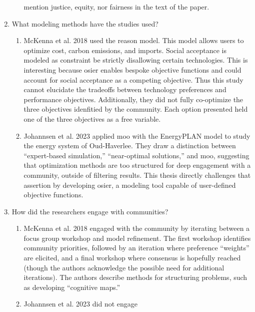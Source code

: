 \begin{enumerate}
\begin{enumerate}
        mention justice, equity, nor fairness in the text of the paper.
    \end{enumerate}
    \item What modeling methods have the studies used?
    \begin{enumerate}
        \item McKenna et al. 2018 \cite{mckenna_combining_2018} used the
        \ac{reason} model. This model allows users to optimize cost, carbon
        emissions, and imports. Social acceptance is modeled as constraint be
        strictly disallowing certain technologies. This is interesting because
        \ac{osier} enables bespoke objective functions and could account for
        social acceptance as a competing objective. Thus this study cannot
        elucidate the tradeoffs between technology preferences and performance
        objectives. Additionally, they did not fully co-optimize the three
        objectives idenfitied by the community. Each option presented held one
        of the three objectives as a free variable.
        \item Johannsen et al. 2023 \cite{johannsen_municipal_2023} applied
        \ac{moo} with the EnergyPLAN model to study the energy system of
        Oud-Haverlee. They draw a distinction between ``expert-based
        simulation,'' ``near-optimal solutions,'' and \ac{moo}, suggesting that
        optimization methods are too structured for deep engagement with a
        community, outside of filtering results. This thesis directly challenges
        that assertion by developing \ac{osier}, a modeling tool capable of
        user-defined objective functions.
    \end{enumerate}
    \item How did the researchers engage with communities?
    \begin{enumerate}
        \item McKenna et al. 2018 \cite{mckenna_combining_2018} engaged with the
        community by iterating between a focus group workshop and model
        refinement. The first workshop identifies community priorities, followed
        by an iteration where preference ``weights'' are elicited, and a final
        workshop where consensus is hopefully reached (though the authors
        acknowledge the possible need for additional iterations). The authors
        describe methods for structuring problems, such as developing
        ``cognitive maps.''
        \item Johannsen et al. 2023 \cite{johannsen_municipal_2023} did not engage

\end{enumerate}
\end{enumerate}
